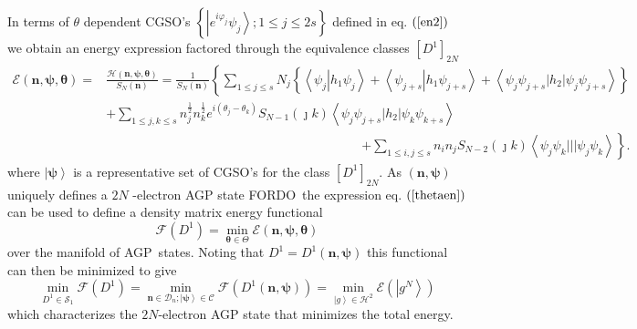 \documentclass[aps,preprint]{revtex4}%
\begin{document}
In terms of $\theta$ dependent CGSO's $\left\{  \left\vert e^{i\varphi_{j}%
}\psi_{j}\right\rangle ;1\leq j\leq2s\right\}  $ defined in eq. $\left(
\ref{en2}\right)  $ we obtain an energy expression factored through the
equivalence classes $\left[  D^{1}\right]  _{2N}$
\begin{align}
\mathcal{E}\left(  \mathbf{n},\mathbf{\psi},\mathbf{\theta}\right)  =  &
\frac{\mathcal{H}\left(  \mathbf{n},\mathbf{\psi},\mathbf{\theta}\right)
}{S_{N}\left(  \mathbf{n}\right)  }=\frac{1}{S_{N}\left(  \mathbf{n}\right)
}\left\{  \sum_{1\leq j\leq s}N_{j}\left\{  \left\langle \psi_{j}\left\vert
h_{1}\psi_{j}\right.  \right\rangle +\left\langle \psi_{j+s}\left\vert
h_{1}\psi_{j+s}\right.  \right\rangle +\left\langle \psi_{j}\psi_{j+s}%
|h_{2}|\psi_{j}\psi_{j+s}\right\rangle \right\}  \right. \nonumber\\
&  +\sum_{1\leq j,k\leq s}n_{j}^{\frac{1}{2}}n_{k}^{\frac{1}{2}}e^{i\left(
\theta_{j}-\theta_{k}\right)  }S_{N-1}\left(  \jmath k\right)  \left\langle
\psi_{j}\psi_{j+s}|h_{2}|\psi_{k}\psi_{k+s}\right\rangle \nonumber\\
&  \qquad\qquad\qquad\qquad\qquad\qquad\qquad\qquad\qquad\qquad\left.
+\sum_{1\leq i,j\leq s}n_{i}n_{j}S_{N-2}\left(  \jmath k\right)  \left\langle
\psi_{j}\psi_{k}|||\psi_{j}\psi_{k}\right\rangle \right\}  . \label{thetaen}%
\end{align}
where $\left\vert \mathbf{\psi}\right\rangle $ is a representative set of
CGSO's for the class $\left[  D^{1}\right]  _{2N}$. As $\left(  \mathbf{n}%
,\mathbf{\psi}\right)  $ uniquely defines a $2N$ -electron AGP state
FORDO\ the expression eq. $\left(  \ref{thetaen}\right)  $ can be used to
define a density matrix energy functional
\begin{equation}
\mathcal{F}\left(  D^{1}\right)  =\min_{\mathbf{\theta\in}\Theta}%
\mathcal{E}\left(  \mathbf{n},\mathbf{\psi},\mathbf{\theta}\right)
\end{equation}
over the manifold of AGP\ states. Noting that $D^{1}=D^{1}\left(
\mathbf{n},\mathbf{\psi}\right)  $ this functional can then be minimized to
give
\begin{equation}
\min_{D^{1}\in\mathcal{S}_{1}}\mathcal{F}\left(  D^{1}\right)  =\min
_{\mathbf{n\in}\mathcal{D}_{n};\left\vert \mathbf{\psi}\right\rangle
\in\mathcal{C}}\mathcal{F}\left(  D^{1}\left(  \mathbf{n},\mathbf{\psi
}\right)  \right)  =\min_{\left\vert g\right\rangle \in\mathcal{H}^{2}%
}\mathcal{E}\left(  \left\vert g^{N}\right\rangle \right)
\end{equation}
which characterizes the $2N$-electron AGP state that minimizes the total energy.
\end{document}
